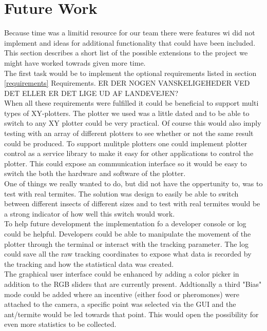 
\section{Future Work}

Because time was a limitid resource for our team there were features wi did not implement and ideas for additional functionality that could have been included. This section describes a short list of the possible extensions to the project we might have worked towrads given more time. \\

The first task would be to implement the optional requirements listed in section \ref{requirements} Requirements. ER DER NOGEN VANSKELIGEHEDER VED DET ELLER ER DET LIGE UD AF LANDEVEJEN? \\

When all these requirements were fulfilled it could be beneficial to support multi types of XY-plotters. The plotter we used was a little dated and to be able to switch to any XY plotter could be very practical. Of course this would also imply testing with an array of different plotters to see whether or not the same result could be produced. To support mulitple plotters one could implement plotter control as a service library to make it easy for other applications to control the plotter. This could expose an communication interface so it would be easy to switch the both the hardware and software of the plotter. \\

One of things we really wanted to do, but did not have the oppertunity to, was to test with real termites. The solution was design to easily be able to switch between different insects of different sizes and to test with real termites would be a strong indicator of how well this switch would work. \\

To help future development the implementation fo a developer console or log could be helpful. Developers could be able to manipulate the movement of the plotter through the terminal or interact with the tracking parameter. The log could save all the raw tracking coordinates to expose what data is recorded by the tracking and how the statistical data was created. \\

The graphical user interface could be enhanced by adding a color picker in addition to the RGB sliders that are currently present. Addtionally a third "Bias" mode could be added where an incentive (either food or pheromones) were attached to the camera, a specific point was selected via the GUI and the ant/termite would be led towards that point. This would open the possibility for even more statistics to be collected.